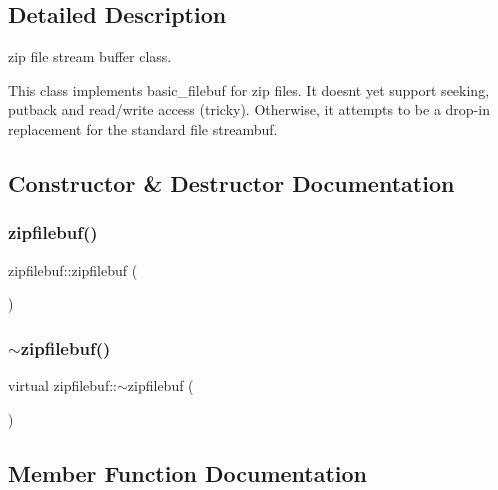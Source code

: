 \subsection{Detailed Description}
zip file stream buffer class. 

This class implements basic\+\_\+filebuf for zip files. It doesn\textquotesingle{}t yet support seeking, putback and read/write access (tricky). Otherwise, it attempts to be a drop-\/in replacement for the standard file streambuf. 

\subsection{Constructor \& Destructor Documentation}
\mbox{\label{classzipfilebuf_a9d57ce4c64f37bfe40ec169a0569d010}} 
\subsubsection{\texorpdfstring{zipfilebuf()}{zipfilebuf()}}
{\footnotesize\ttfamily zipfilebuf\+::zipfilebuf (\begin{DoxyParamCaption}{ }\end{DoxyParamCaption})}

\mbox{\label{classzipfilebuf_a3b54e3912c0d1a9df244ee1cf4567a78}} 
\subsubsection{\texorpdfstring{$\sim$zipfilebuf()}{~zipfilebuf()}}
{\footnotesize\ttfamily virtual zipfilebuf\+::$\sim$zipfilebuf (\begin{DoxyParamCaption}{ }\end{DoxyParamCaption})\hspace{0.3cm}{\ttfamily [virtual]}}



\subsection{Member Function Documentation}
\mbox{\label{classzipfilebuf_af9c0ac8b4fef88831bf6f76a7ae35952}} 
